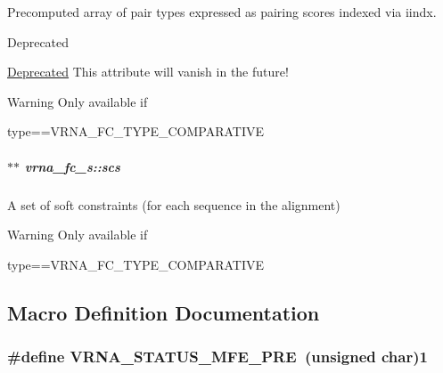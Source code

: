 Precomputed array of pair types expressed as pairing scores indexed via iindx. 

\begin{DoxyRefDesc}{Deprecated}
\item[\hyperlink{deprecated__deprecated000052}{Deprecated}]This attribute will vanish in the future! \end{DoxyRefDesc}
\begin{DoxyWarning}{Warning}
Only available if\begin{DoxyVerb}type==VRNA_FC_TYPE_COMPARATIVE \end{DoxyVerb}
 
\end{DoxyWarning}
\subparagraph[{\texorpdfstring{scs}{scs}}]{$\ast$$\ast$ vrna\+\_\+fc\+\_\+s\+::scs}\hypertarget{group__fold__compound_ac2b047fddabc51a76a96511174e47db1}{}\label{group__fold__compound_ac2b047fddabc51a76a96511174e47db1}


A set of soft constraints (for each sequence in the alignment) 

\begin{DoxyWarning}{Warning}
Only available if\begin{DoxyVerb}type==VRNA_FC_TYPE_COMPARATIVE \end{DoxyVerb}
 
\end{DoxyWarning}


\subsection{Macro Definition Documentation}
\subsubsection[{\texorpdfstring{V\+R\+N\+A\+\_\+\+S\+T\+A\+T\+U\+S\+\_\+\+M\+F\+E\+\_\+\+P\+RE}{VRNA_STATUS_MFE_PRE}}]{\setlength{\rightskip}{0pt plus 5cm}\#define V\+R\+N\+A\+\_\+\+S\+T\+A\+T\+U\+S\+\_\+\+M\+F\+E\+\_\+\+P\+RE~(unsigned char)1}\hypertarget{group__fold__compound_ga1a5053dc8acbb0111e852988726f07d6}{}\label{group__fold__compound_ga1a5053dc8acbb0111e852988726f07d6}


